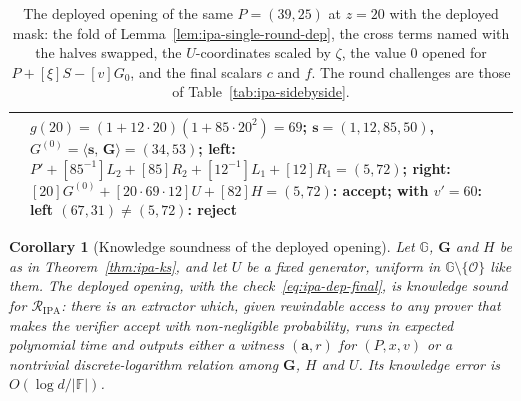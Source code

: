 \documentclass[11pt,a4paper]{article}
\newtheorem{corollary}[theorem]{Corollary}
\theoremstyle{definition}
\newcommand{\F}{\mathbb{F}}
\newcommand{\G}{\mathbb{G}}
\newcommand{\ip}[2]{\langle #1,\, #2 \rangle}
\newcommand{\Rel}{\mathcal{R}}
\begin{document}
\begin{table}[htbp]
\begin{tabular}{@{}l p{5.6cm} p{5.6cm}@{}}
 & $g(20) = (1 + 12\cdot 20)(1 + 85\cdot 20^{2}) = 69$;
   $\mathbf s = (1, 12, 85, 50)$,
   $G^{(0)} = \ip{\mathbf s}{\mathbf G} = (34, 53)$;
   left: $P' + [85^{-1}]L_2 + [85]R_2 + [12^{-1}]L_1 + [12]R_1 = (5, 72)$;
   right: $[20]G^{(0)} + [20 \cdot 69 \cdot 12]U + [82]H = (5, 72)$:
   \textbf{accept}; with $v' = 60$: left $(67, 31) \ne (5, 72)$:
   \textbf{reject} \\
\bottomrule
\end{tabular}
\caption{The deployed opening of the same $P = (39, 25)$ at $z = 20$
with the deployed mask: the fold of
Lemma~\ref{lem:ipa-single-round-dep}, the cross terms named with the
halves swapped, the $U$-coordinates scaled by $\zeta$, the value $0$
opened for $P + [\xi]S - [v]G_0$, and the final scalars $c$ and $f$.
The round challenges are those of Table~\ref{tab:ipa-sidebyside}.}
\label{tab:ipa-toy-deployed}
\end{table}

\begin{corollary}[Knowledge soundness of the deployed opening]
\label{cor:ipa-deployed-ks}
Let $\G$, $\mathbf G$ and $H$ be as in Theorem~\ref{thm:ipa-ks}, and
let $U$ be a fixed generator, uniform in $\G \setminus \{\mathcal O\}$
like them. The deployed opening, with the
check~\eqref{eq:ipa-dep-final}, is knowledge sound for
$\Rel_{\mathrm{IPA}}$: there is an extractor which, given rewindable
access to any prover that makes the verifier accept with
non-negligible probability, runs in expected polynomial time and
outputs either a witness $(\mathbf a, r)$ for $(P, x, v)$ or a
nontrivial discrete-logarithm relation among $\mathbf G$, $H$ and $U$.
Its knowledge error is $O(\log d/|\F|)$.
\end{corollary}
\end{document}
